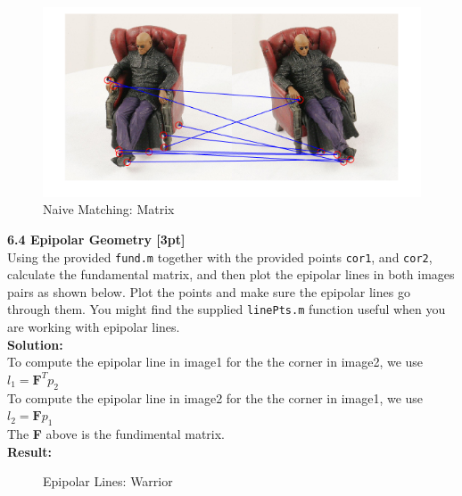 \documentclass{assignment}
\begin{document}
\begin{problemlist}
\begin{figure}[!ht]
\centering
\includegraphics[scale = 1.0]{6_3matrix.png}
\caption{Naive Matching: Matrix}
\end{figure}

\newpage
\textbf{6.4 Epipolar Geometry [3pt]}\\
Using the provided \texttt{fund.m} together with the provided points \texttt{cor1}, and \texttt{cor2}, calculate the fundamental matrix, and then plot the epipolar lines in both images pairs as shown below. Plot the points and make sure the epipolar lines go through them. You might find the supplied \texttt{linePts.m} function useful when you are working with epipolar lines.\\
\textbf{Solution:}\\
To compute the epipolar line in image1 for the the corner in image2, we use $l_1 = \textbf{F}^Tp_2$\\
To compute the epipolar line in image2 for the the corner in image1, we use $l_2 = \textbf{F}p_1$\\
The \textbf{F} above is the fundimental matrix.\\
\textbf{Result:}
\begin{figure}[!ht]
\centering
{}
\caption{Epipolar Lines: Warrior}
\end{figure}


\end{problemlist}
\end{document}
